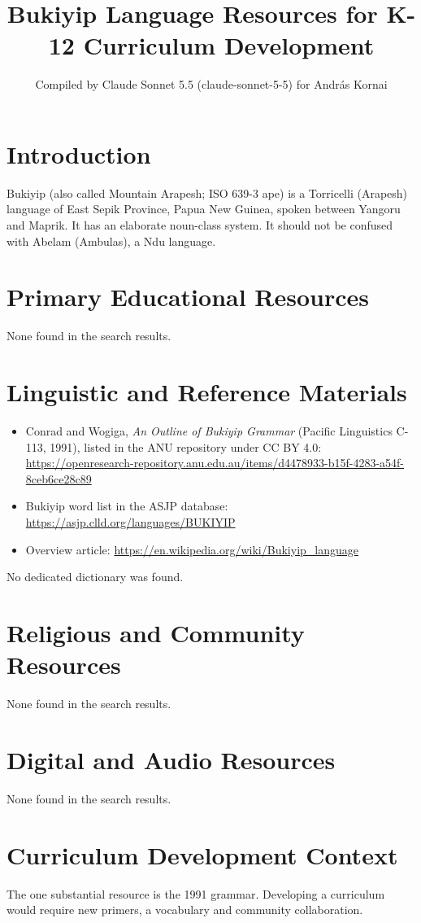 \documentclass[12pt]{article}
\title{Bukiyip Language Resources for K-12 Curriculum Development}
\author{Compiled by Claude Sonnet 5.5 (claude-sonnet-5-5) for Andr\'as Kornai}
\date{}
\begin{document}
\maketitle

\section{Introduction}
Bukiyip (also called Mountain Arapesh; ISO 639-3 ape) is a Torricelli (Arapesh) language of East Sepik Province, Papua New Guinea, spoken between Yangoru and Maprik. It has an elaborate noun-class system. It should not be confused with Abelam (Ambulas), a Ndu language.

\section{Primary Educational Resources}
None found in the search results.

\section{Linguistic and Reference Materials}
\begin{itemize}
\item Conrad and Wogiga, \emph{An Outline of Bukiyip Grammar} (Pacific Linguistics C-113, 1991), listed in the ANU repository under CC BY 4.0: \url{https://openresearch-repository.anu.edu.au/items/d4478933-b15f-4283-a54f-8ceb6ce28c89}
\item Bukiyip word list in the ASJP database: \url{https://asjp.clld.org/languages/BUKIYIP}
\item Overview article: \url{https://en.wikipedia.org/wiki/Bukiyip_language}
\end{itemize}
No dedicated dictionary was found.

\section{Religious and Community Resources}
None found in the search results.

\section{Digital and Audio Resources}
None found in the search results.

\section{Curriculum Development Context}
The one substantial resource is the 1991 grammar. Developing a curriculum would require new primers, a vocabulary and community collaboration.
\end{document}
